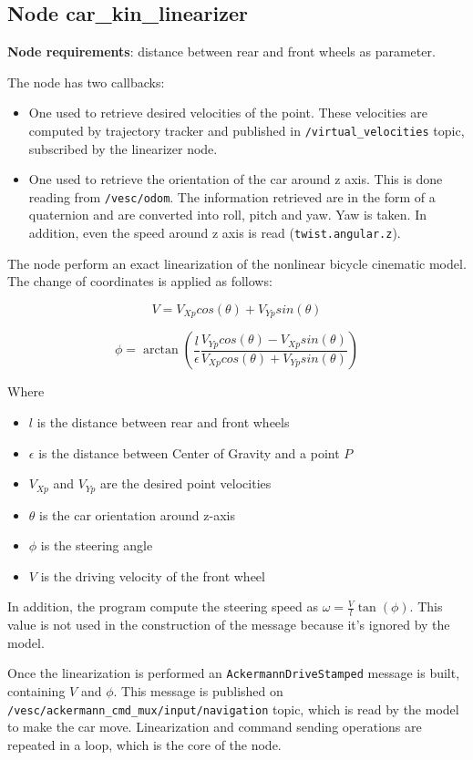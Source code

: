 \subsection{Node car\_kin\_linearizer}

\textbf{Node requirements}: distance between rear and front wheels as parameter.

The node has two callbacks:

\begin{itemize}
	\item One used to retrieve desired velocities of the point. These velocities are computed by trajectory tracker and published in \verb|/virtual_velocities| topic, subscribed by the linearizer node.
	\item One used to retrieve the orientation of the car around z axis. This is done reading from \verb|/vesc/odom|. The information retrieved are in the form of a quaternion and are converted into roll, pitch and yaw. Yaw is taken. In addition, even the speed around z axis is read (\verb|twist.angular.z|).
\end{itemize}

The node perform an exact linearization of the nonlinear bicycle cinematic model. The change of coordinates is applied as follows:

\[
V = V_{Xp}cos(\theta) + V_{Yp}sin(\theta)
\]

\[
\phi = \arctan\left(\frac{l}{\epsilon} \frac{ V_{Yp}cos(\theta) - V_{Xp}sin(\theta) }{ V_{Xp}cos(\theta) + V_{Yp}sin(\theta) }\right)
\]

Where 

\begin{itemize}
	\item $l$ is the distance between rear and front wheels
	\item $\epsilon$ is the distance between Center of Gravity and a point $P$
	\item $V_{Xp}$ and $V_{Yp}$ are the desired point velocities
	\item $\theta$ is the car orientation around z-axis
	\item $\phi$ is the steering angle
	\item $V$ is the driving velocity of the front wheel
\end{itemize}

In addition, the program compute the steering speed as $\omega = \frac{V}{l}\tan(\phi)$. This value is not used in the construction of the message because it's ignored by the model.

Once the linearization is performed an \verb|AckermannDriveStamped| message is built, containing $V$ and $\phi$. This message is published on \\ \verb|/vesc/ackermann_cmd_mux/input/navigation| topic, which is read by the model to make the car move. Linearization and command sending operations are repeated in a loop, which is the core of the node.